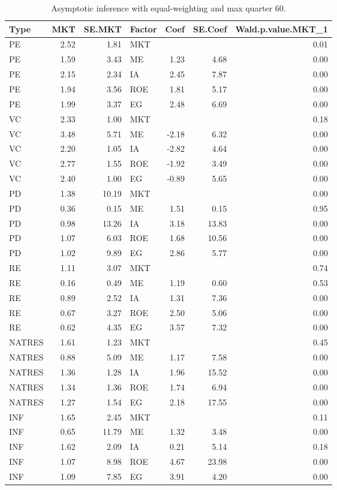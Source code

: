 \documentclass[12pt]{article}
\begin{document}
\begin{table}[ht]
	\centering
	\begin{tabular}{lrrlrrr}
		\hline
		Type & MKT & SE.MKT & Factor & Coef & SE.Coef & Wald.p.value.MKT\_1 \\ 
		\hline
		PE & 2.52 & 1.81 & MKT &  &  & 0.01 \\ 
		PE & 1.59 & 3.43 & ME & 1.23 & 4.68 & 0.00 \\ 
		PE & 2.15 & 2.34 & IA & 2.45 & 7.87 & 0.00 \\ 
		PE & 1.94 & 3.56 & ROE & 1.81 & 5.17 & 0.00 \\ 
		PE & 1.99 & 3.37 & EG & 2.48 & 6.69 & 0.00 \\ 
		VC & 2.33 & 1.00 & MKT &  &  & 0.18 \\ 
		VC & 3.48 & 5.71 & ME & -2.18 & 6.32 & 0.00 \\ 
		VC & 2.20 & 1.05 & IA & -2.82 & 4.64 & 0.00 \\ 
		VC & 2.77 & 1.55 & ROE & -1.92 & 3.49 & 0.00 \\ 
		VC & 2.40 & 1.00 & EG & -0.89 & 5.65 & 0.00 \\ 
		PD & 1.38 & 10.19 & MKT &  &  & 0.00 \\ 
		PD & 0.36 & 0.15 & ME & 1.51 & 0.15 & 0.95 \\ 
		PD & 0.98 & 13.26 & IA & 3.18 & 13.83 & 0.00 \\ 
		PD & 1.07 & 6.03 & ROE & 1.68 & 10.56 & 0.00 \\ 
		PD & 1.02 & 9.89 & EG & 2.86 & 5.77 & 0.00 \\ 
		RE & 1.11 & 3.07 & MKT &  &  & 0.74 \\ 
		RE & 0.16 & 0.49 & ME & 1.19 & 0.60 & 0.53 \\ 
		RE & 0.89 & 2.52 & IA & 1.31 & 7.36 & 0.00 \\ 
		RE & 0.67 & 3.27 & ROE & 2.50 & 5.06 & 0.00 \\ 
		RE & 0.62 & 4.35 & EG & 3.57 & 7.32 & 0.00 \\ 
		NATRES & 1.61 & 1.23 & MKT &  &  & 0.45 \\ 
		NATRES & 0.88 & 5.09 & ME & 1.17 & 7.58 & 0.00 \\ 
		NATRES & 1.36 & 1.28 & IA & 1.96 & 15.52 & 0.00 \\ 
		NATRES & 1.34 & 1.36 & ROE & 1.74 & 6.94 & 0.00 \\ 
		NATRES & 1.27 & 1.54 & EG & 2.18 & 17.55 & 0.00 \\ 
		INF & 1.65 & 2.45 & MKT &  &  & 0.11 \\ 
		INF & 0.65 & 11.79 & ME & 1.32 & 3.48 & 0.00 \\ 
		INF & 1.62 & 2.09 & IA & 0.21 & 5.14 & 0.18 \\ 
		INF & 1.07 & 8.98 & ROE & 4.67 & 23.98 & 0.00 \\ 
		INF & 1.09 & 7.85 & EG & 3.91 & 4.20 & 0.00 \\ 
		\hline
	\end{tabular}
	\caption{Asymptotic inference with equal-weighting and max quarter 60.} 
\end{table}
\end{document}
